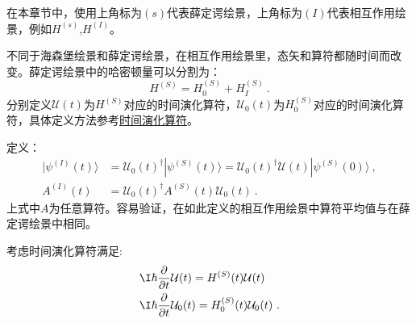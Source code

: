 
在本章节中，使用上角标为$(s)$代表薛定谔绘景，上角标为$(I)$代表相互作用绘景，例如$H^{(s)}$,$H^{(I)}$。

\begin{definition}{}

不同于海森堡绘景和薛定谔绘景，在相互作用绘景里，态矢和算符都随时间而改变。薛定谔绘景中的哈密顿量可以分割为：
\begin{equation}
H^{(S)}=H^{(S)}_0+H^{(S)}_I~.
\end{equation}
分别定义$\mathcal U(t)$为$H^{(S)}$对应的时间演化算符，$\mathcal U_0(t)$为$H^{(S)}_0$对应的时间演化算符，具体定义方法参考\href{https://wuli.wiki/online/TOprt.html}{时间演化算符}。

定义：
\begin{align}
|\psi^{(I)}(t)\rangle&=\mathcal U_0(t)^\dagger|\psi^{(S)}(t)\rangle=\mathcal U_0(t)^\dagger\mathcal U(t)|\psi^{(S)}(0)\rangle~, \\
A^{(I)}(t)&=\mathcal U_0(t)^\dagger A^{(S)}(t)\mathcal U_0 (t)~.
\end{align}
上式中$A$为任意算符。容易验证，在如此定义的相互作用绘景中算符平均值与在薛定谔绘景中相同。

\end{definition}

考虑时间演化算符满足:
\begin{align}
&\I\hbar\frac{\partial}{\partial t}\mathcal{U}(t) = H^{(S)}(t)\mathcal{U}(t) \\
&\I\hbar\frac{\partial}{\partial t}\mathcal{U}_0(t) = H^{(S)}_0(t)\mathcal{U}_0(t)~.
\end{align}

